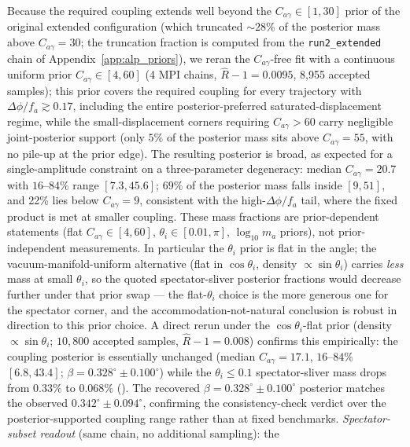 \documentclass[aps,prd,twocolumn,superscriptaddress,showpacs,preprintnumbers,nofootinbib,longbibliography,floatfix]{revtex4-2}
\begin{document}
Because the required coupling extends well beyond the
$C_{a\gamma}\in[1,30]$ prior of the original extended configuration (which
truncated ${\sim}28\%$ of the posterior mass above $C_{a\gamma}=30$; the
truncation fraction is computed from the \texttt{run2\_extended} chain of
Appendix~\ref{app:alp_priors}), we reran
the $C_{a\gamma}$-free fit with a continuous uniform prior
$C_{a\gamma}\in[4,60]$ (4 MPI chains,
$\hat{R}-1=0.0095$, 8{,}955 accepted samples); this prior covers the
required coupling for every trajectory with $\Delta\phi/f_a \gtrsim 0.17$,
including the entire posterior-preferred saturated-displacement regime,
while the small-displacement corners requiring $C_{a\gamma} > 60$ carry
negligible joint-posterior support (only $5\%$ of the posterior mass sits
above $C_{a\gamma}=55$, with no pile-up at the prior edge). The resulting
posterior is broad, as expected for a single-amplitude constraint on a
three-parameter degeneracy: median $C_{a\gamma}=20.7$ with $16$--$84\%$
range $[7.3, 45.6]$; $69\%$ of the posterior mass falls inside $[9,51]$,
and 22\% lies below
$C_{a\gamma}=9$, consistent with the high-$\Delta\phi/f_a$ tail, where the
fixed product is met at smaller coupling. These mass fractions are
prior-dependent statements (flat $C_{a\gamma}\in[4,60]$,
$\theta_i\in[0.01,\pi]$, $\log_{10}m_a$ priors), not prior-independent
measurements. In particular the $\theta_i$ prior is flat in the angle;
the vacuum-manifold-uniform alternative (flat in $\cos\theta_i$, density
$\propto\sin\theta_i$) carries \emph{less} mass at small $\theta_i$, so
the quoted spectator-sliver posterior fractions would decrease further
under that prior swap --- the flat-$\theta_i$ choice is the more
generous one for the spectator corner, and the accommodation-not-natural
conclusion is robust in direction to this prior choice. A direct rerun
under the $\cos\theta_i$-flat prior (density $\propto\sin\theta_i$;
$10{,}800$ accepted samples, $\hat R-1=0.008$) confirms this empirically:
the coupling posterior is essentially unchanged (median
$C_{a\gamma}=17.1$, $16$--$84\%$ $[6.8,43.4]$;
$\beta=0.328^\circ\pm 0.100^\circ$) while the $\theta_i\le 0.1$
spectator-sliver mass drops from $0.33\%$ to $0.068\%$
(). The recovered
$\beta=0.328^\circ\pm0.100^\circ$ posterior matches the observed
$0.342^\circ\pm0.094^\circ$, confirming the consistency-check verdict over
the posterior-supported coupling range rather than at fixed benchmarks.
\emph{Spectator-subset readout} (same chain, no additional sampling): the
\end{document}
